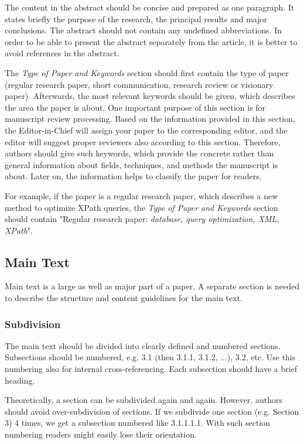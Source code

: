 \documentclass{ronpub}  %
\begin{document}
The content in the abstract should be concise and prepared as one paragraph. It states briefly the purpose of the research, the principal results and major conclusions. The abstract should not contain any undefined abbreviations. In order to be able to present the abstract separately from the article, it is better to avoid references in the abstract.

The \emph{Type of Paper and Keywords} section should first contain the type of paper (regular research paper, short communication, research review or visionary paper). Afterwards, the most relevant keywords should be given, which describes the area the paper is about. One important purpose of this section is for manuscript review processing. Based on the information provided in this section, the Editor-in-Chief will assign your paper to the corresponding editor, and the editor will suggest proper reviewers also according to this section. Therefore, authors should give such keywords, which provide the concrete rather than general information about fields, techniques, and methods the manuscript is about. Later on, the information helps to classify the paper for readers. 

For example, if the paper is a regular research paper, which describes a new method to optimize XPath queries, the \emph{Type of Paper and Keywords} section should contain "Regular research paper: \emph{database, query optimization, XML, XPath}".

\subsection{Main Text}

Main text is a large as well as major part of a paper. A separate section is needed to describe the structure and content guidelines for the main text.

\subsubsection{Subdivision}

The main text should be divided into clearly defined and numbered sections. Subsections should be numbered, e.g. 3.1 (then 3.1.1, 3.1.2, ...), 3.2, etc. Use this numbering also for internal cross-referencing. Each subsection should have a brief heading. 

Theoretically, a section can be subdivided again and again. However, authors should avoid over-subdivision of sections. If we subdivide one section (e.g. Section 3) 4 times, we get a subsection numbered like 3.1.1.1.1. With such section numbering readers might easily lose their orientation.
\end{document}
